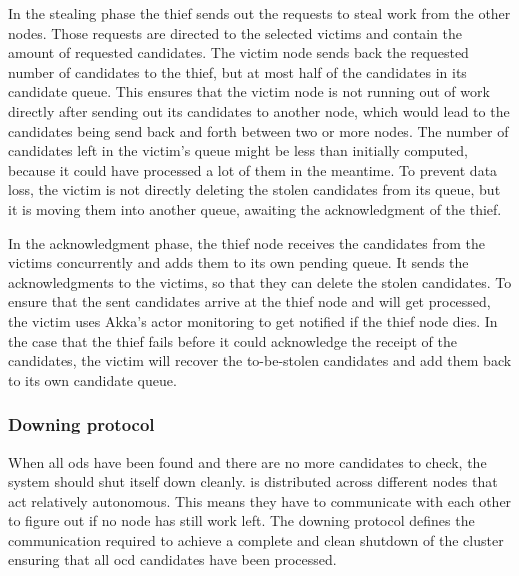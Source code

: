   In the stealing phase the thief sends out the requests to steal work from the other nodes.
  Those requests are directed to the selected victims and contain the amount of requested candidates.
  The victim node sends back the requested number of candidates to the thief, but at most half of the candidates in its candidate queue.
  This ensures that the victim node is not running out of work directly after sending out its candidates to another node, which would lead to the candidates being send back and forth between two or more nodes.
  The number of candidates left in the victim's queue might be less than initially computed, because it could have processed a lot of them in the meantime.
  To prevent data loss, the victim is not directly deleting the stolen candidates from its queue, but it is moving them into another queue, awaiting the acknowledgment of the thief.

  In the acknowledgment phase, the thief node receives the candidates from the victims concurrently and adds them to its own pending queue.
  It sends the acknowledgments to the victims, so that they can delete the stolen candidates.
  To ensure that the sent candidates arrive at the thief node and will get processed, the victim uses Akka's actor monitoring to get notified if the thief node dies.
  In the case that the thief fails before it could acknowledge the receipt of the candidates, the victim will recover the to-be-stolen candidates and add them back to its own candidate queue.

\subsubsection{Downing protocol}\label{protocol:downing}
  When all \glspl{od} have been found and there are no more candidates to check, the system should shut itself down cleanly.
  \dodo{} is distributed across different nodes that act relatively autonomous.
  This means they have to communicate with each other to figure out if no node has still work left.
  The downing protocol defines the communication required to achieve a complete and clean shutdown of the cluster ensuring that all \gls{ocd} candidates have been processed.

